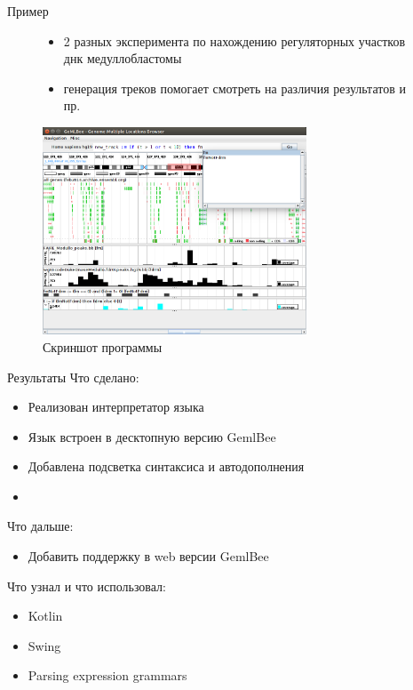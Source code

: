 \begin{frame}{Пример}
\begin{figure}
\small{
	\begin{itemize}
		\item 2 разных эксперимента по нахождению регуляторных участков днк медуллобластомы
		\item генерация треков помогает смотреть на различия результатов и пр.
	\end{itemize}
}
\centering
\includegraphics[width=0.7\textwidth]{ex.png}
\caption{Скриншот программы}
\end{figure}
\end{frame}

\begin{frame}{Результаты}
\alert{Что сделано:}
\begin{itemize}
	\item Реализован интерпретатор языка
	\item Язык встроен в десктопную версию GemlBee
	\item Добавлена подсветка синтаксиса и автодополнения
	\item {}
\end{itemize}
\alert{Что дальше:}
\begin{itemize}
	\item Добавить поддержку в web версии GemlBee
\end{itemize}

\alert{Что узнал и что использовал:}
\begin{itemize}
	\item Kotlin
	\item Swing
	\item Parsing expression grammars
\end{itemize}
\end{frame}

